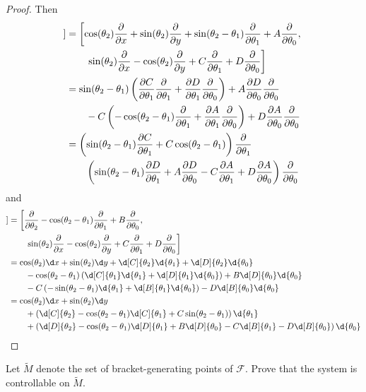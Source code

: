 \documentclass{article}
\begin{document}
\begin{proof}
Then 
\begin{align*}
[X_1, [X_1, X_2]] & = \left[ \cos(\theta_2) \pder x  + \sin(\theta_2) \pder y  + \sin(\theta_2 - \theta_1)  \pder {\theta_1} + A \pder {\theta_0}, \right.
\\ & \quad \quad \left.  \sin(\theta_2) \pder x  - \cos(\theta_2) \pder y + C \pder {\theta_1} + D \pder {\theta_0} \right]
\\ & = \sin(\theta_2 - \theta_1) \left( \pder [C] {\theta_1} \pder {\theta_1} + \pder [D] {\theta_1} \pder {\theta_0} \right)
 + A \pder [D] {\theta_0} \pder {\theta_0}
\\ & \quad \quad - C \left( -\cos(\theta_2 - \theta_1) \pder {\theta_1} + \pder [A] {\theta_1} \pder {\theta_0} \right) + D \pder [A] {\theta_0} \pder {\theta_0}
\\ & = \left(  \sin(\theta_2 - \theta_1) \pder[C]{\theta_1} + C \cos(\theta_2 - \theta_1) \right)\pder {\theta_1}
\\ & \quad \quad \left( \sin(\theta_2 - \theta_1) \pder[D]{\theta_1} + A \pder[D]{\theta_0} - C \pder[A]{\theta_1} + D \pder[A]{\theta_0} \right) \pder {\theta_0}
\end{align*}
and
\begin{align*}
[X_2, [X_1, X_2]] & = \left[  \pder {\theta_2} - \cos(\theta_2 - \theta_1) \pder {\theta_1} + B \pder {\theta_0}  ,\right.
\\ & \quad \quad \left.  \sin(\theta_2) \pder x  - \cos(\theta_2) \pder y + C \pder {\theta_1} + D \pder {\theta_0} \right]
\\ & = \cos(\theta_2) \d x + \sin(\theta_2) \d y + \d[C]{\theta_2} \d{\theta_1} + \d[D]{\theta_2} \d{\theta_0}
\\ & \quad \quad -\cos(\theta_2 - \theta_1) \left(\d[C]{\theta_1} \d{\theta_1} + \d[D]{\theta_1} \d{\theta_0}\right) + B \d[D]{\theta_0} \d{\theta_0}
\\ & \quad \quad - C \left( -\sin(\theta_2 - \theta_1) \d{\theta_1} + \d[B]{\theta_1} \d{\theta_0} \right) - D \d[B]{\theta_0} \d{\theta_0}
\\ & = \cos(\theta_2) \d x + \sin(\theta_2) \d y 
\\ & \quad \quad + \left(\d[C]{\theta_2}  - \cos(\theta_2 - \theta_1) \d[C]{\theta_1} + C \sin(\theta_2 - \theta_1) \right) \d{\theta_1} 
\\ & \quad \quad + \left( \d[D]{\theta_2} - \cos(\theta_2 - \theta_1) \d[D]{\theta_1} + B \d[D]{\theta_0} - C \d[B]{\theta_1} - D \d[B]{\theta_0} \right) \d{\theta_0}
\end{align*}


\end{proof}


 Let $\widetilde M$ denote the set of bracket-generating points of $\mathcal F$. Prove that the system is controllable on $\widetilde M$.
\end{document}
